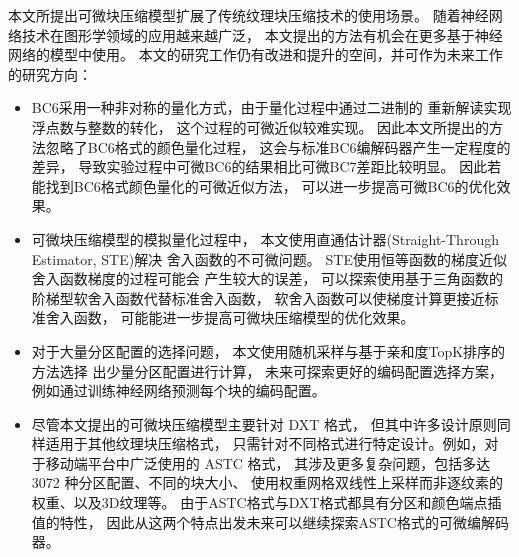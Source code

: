 本文所提出可微块压缩模型扩展了传统纹理块压缩技术的使用场景。
随着神经网络技术在图形学领域的应用越来越广泛，
本文提出的方法有机会在更多基于神经网络的模型中使用。
本文的研究工作仍有改进和提升的空间，并可作为未来工作的研究方向：
\begin{itemize}
    \item BC6采用一种非对称的量化方式，由于量化过程中通过二进制的
    重新解读实现浮点数与整数的转化，
    这个过程的可微近似较难实现。
    因此本文所提出的方法忽略了BC6格式的颜色量化过程，
    这会与标准BC6编解码器产生一定程度的差异，
    导致实验过程中可微BC6的结果相比可微BC7差距比较明显。
    因此若能找到BC6格式颜色量化的可微近似方法，
    可以进一步提高可微BC6的优化效果。

    \item 可微块压缩模型的模拟量化过程中，
    本文使用直通估计器(Straight-Through Estimator, STE)解决
    舍入函数的不可微问题。
    STE使用恒等函数的梯度近似舍入函数梯度的过程可能会
    产生较大的误差，
    可以探索使用基于三角函数的阶梯型软舍入函数代替标准舍入函数，
    软舍入函数可以使梯度计算更接近标准舍入函数，
    可能能进一步提高可微块压缩模型的优化效果。

    \item   
    对于大量分区配置的选择问题，
    本文使用随机采样与基于亲和度TopK排序的方法选择
    出少量分区配置进行计算，
    未来可探索更好的编码配置选择方案，
    例如通过训练神经网络预测每个块的编码配置。

    \item   
    尽管本文提出的可微块压缩模型主要针对 DXT 格式，
    但其中许多设计原则同样适用于其他纹理块压缩格式，
    只需针对不同格式进行特定设计。例如，对于移动端平台中广泛使用的 ASTC 格式，
    其涉及更多复杂问题，包括多达 3072 种分区配置、不同的块大小、
    使用权重网格双线性上采样而非逐纹素的权重、以及3D纹理等。
    由于ASTC格式与DXT格式都具有分区和颜色端点插值的特性，
    因此从这两个特点出发未来可以继续探索ASTC格式的可微编解码器。


\end{itemize}




